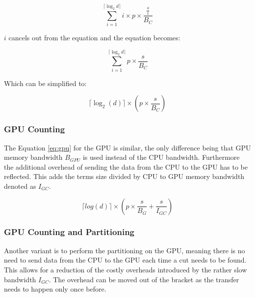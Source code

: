 \documentclass[]{article}
\begin{document}
\begin{center}
	\begin{equation}
		\sum_{i=1}^{\lceil \log_2{d} \rceil} i \times p \times  \frac{ \frac{s}{i}}{B_C} 
		\label{eq:cpu1}
	\end{equation}
\end{center}

$i$ cancels out from the equation and the equation becomes:

\begin{center}
	\begin{equation}
		\sum_{i=1}^{\lceil \log_2{d} \rceil} p \times \frac{s}{B_C} 
		\label{eq:cpu2}
	\end{equation}
\end{center}

Which can be simplified to:

\begin{center}
	\begin{equation}
		\lceil \log_2(d) \rceil  \times \left ( p \times \frac{ s }{B_{C}} \right )
		\label{eq:cpu}
	\end{equation}
\end{center}

\subsubsection{GPU Counting}


The Equation \ref{eq:gpu} for the GPU is similar, the only difference being that  GPU memory bandwidth $B_{GPU}$ is used instead of the CPU bandwidth. Furthermore the additional overhead of sending the data from the CPU to the GPU has to be reflected. This adds the terms size divided by CPU to GPU memory bandwidth denoted as $I_{GC}$.

\begin{center}
	\begin{equation}
			\lceil log(d) \rceil \times \left ( p \times \frac{s}{B_{G}} +\frac{s}{I_{GC}} \right ) 
		\label{eq:gpu}
	\end{equation}
\end{center}


\subsubsection{GPU Counting and Partitioning}\label{gpu-tree-building}

Another variant is to perform the partitioning on the GPU, meaning there is no need to send data from the CPU to the GPU each time a cut needs to be found. This allows for a reduction of the costly overheads introduced by the rather slow bandwidth $I_{GC}$. The overhead can be moved out of the bracket as the transfer needs to happen only once before. 
\end{document}
